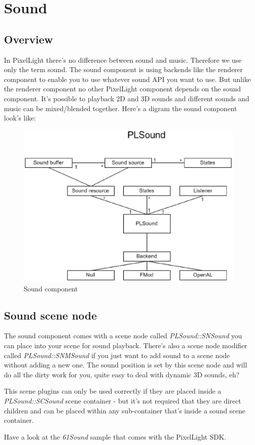 \chapter{Sound}




\section{Overview}
In PixelLight there's no difference between sound and music. Therefore we use only the term sound. The sound component is using backends like the renderer component to enable you to use whatever sound API you want to use. But unlike the renderer component no other PixelLight component depends on the sound component. It's possible to playback 2D and 3D sounds and different sounds and music can be mixed/blended together. Here's a digram the sound component look's like:\\
\begin{figure}
  \begin{center}
    \includegraphics{pics/PLSoundClassDiagram.eps}
  \end{center}
  \caption{Sound component}
  \label{fig:Sound component high-level UML class diagram}
\end{figure}




\section{Sound scene node}
The sound component comes with a scene node called \emph{PLSound::SNSound} you can place into your scene for sound playback. There's also a scene node modifier called \emph{PLSound::SNMSound} if you just want to add sound to a scene node without adding a new one. The sound position is set by this scene node and will do all the dirty work for you, quite easy to deal with dynamic 3D sounds, eh?

This scene plugins can only be used correctly if they are placed inside a \emph{PLSound::SCSound} scene container - but it's not required that they are direct children and can be placed within any sub-container that's inside a sound scene container.

Have a look at the \emph{61Sound} sample that comes with the PixelLight SDK.
